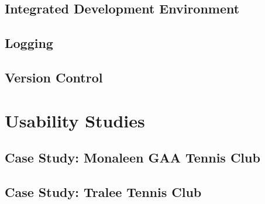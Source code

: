 \subsection{Integrated Development Environment}

\subsection{Logging}

\subsection{Version Control}




\section{Usability Studies}

\subsection{Case Study: Monaleen GAA Tennis Club}

\subsection{Case Study: Tralee Tennis Club}
